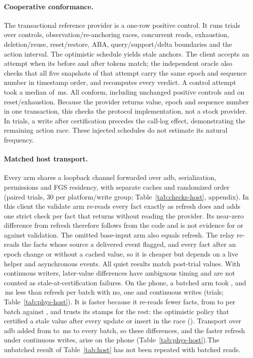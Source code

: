 \paragraph{Cooperative conformance.} The transactional reference provider is a one-row positive control. It runs \RevReference trials over controls, observation/re-anchoring races, concurrent reads, exhaustion, deletion/reuse, reset/restore, ABA, query/support/delta boundaries and the action interval. The optimistic schedule yields \RevReferenceRace stale anchors. The client accepts an attempt when its before and after tokens match; the independent oracle also checks that all five snapshots of that attempt carry the same epoch and sequence number in timestamp order, and recomputes every verdict. A control attempt took a median of \RefBracketMs\,ms. All conform, including unchanged positive controls and \Unknown on reset/exhaustion. Because the provider returns value, epoch and sequence number in one transaction, this checks the protocol implementation, not a stock provider. In \RevActionResidual trials, a write after certification precedes the call-log effect, demonstrating the remaining action race. These injected schedules do not estimate its natural frequency.

\paragraph{Matched host transport.} Every arm shares a loopback channel forwarded over adb, serialization, permissions and FGS residency, with separate caches and randomized order (\RevHost paired trials, 30 per platform/write group; Table~\ref{tab:checks-host}, appendix). In this client the validate arm re-reads every fact exactly as refresh does and adds one strict check per fact that returns \Unknown without reading the provider. Its near-zero difference from refresh therefore follows from the code and is not evidence for or against validation. The omitted base-input arm also equals refresh. The relay re-reads the facts whose source a delivered event flagged, and every fact after an epoch change or without a cached value, so it is cheaper but depends on a live helper and asynchronous events. All quiet results match post-trial values. With continuous writers, later-value differences have ambiguous timing and are not counted as stale-at-certification failures. \ifPhysHost On the phone, a batched \stamp arm took \PhysHostStampGainNone, \PhysHostStampGainOne and \PhysHostStampGainContinuous\,ms less than refresh per batch with no, one and continuous writes (\PhysHostTrials trials; Table~\ref{tab:phys-host}). It is faster because it re-reads fewer facts, from \PhysHostReadsStampMin to \PhysHostReadsStampMax per batch against \PhysHostReadsRefresh, and trusts its stamps for the rest: the optimistic policy that certified a stale value after every update or insert in the race (\PhysRaceStampedStale). Transport over adb added from \PhysHostTransportMin to \PhysHostTransportMax\,ms to every batch, so these differences, and the faster refresh under continuous writes, arise on the phone (Table~\ref{tab:phys-host}).\else The unbatched \stamp result of Table~\ref{tab:host} has not been repeated with batched reads.\fi

